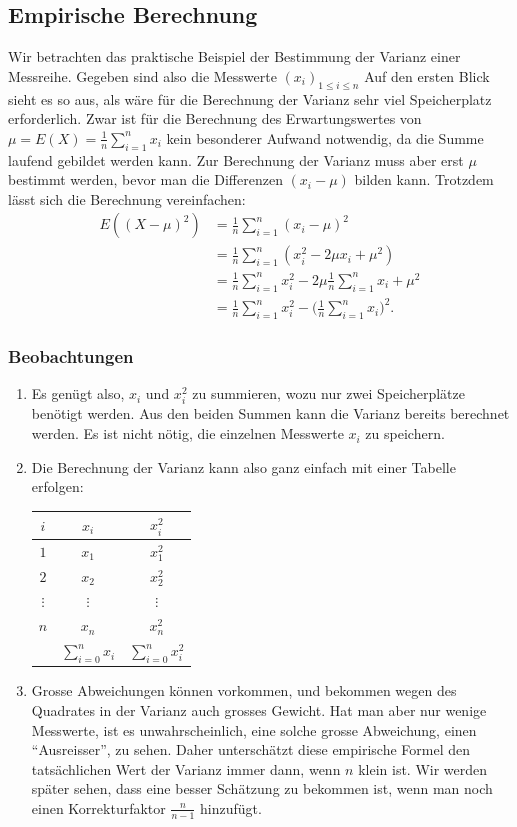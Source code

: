 \subsection{Empirische Berechnung}
Wir betrachten das praktische Beispiel der Bestimmung der Varianz
einer Messreihe.
Gegeben sind also die Messwerte $(x_i)_{1\le i\le n}$
Auf den ersten Blick sieht es so aus, als wäre für die Berechnung der Varianz
sehr viel Speicherplatz erforderlich.
Zwar ist für die Berechnung des
Erwartungswertes von $\mu=E(X)=\frac1n\sum_{i=1}^n x_i$ kein besonderer Aufwand
notwendig, da die Summe laufend gebildet werden kann.
Zur Berechnung der
Varianz muss aber erst $\mu$ bestimmt werden, bevor man die Differenzen $(x_i-\mu)$
bilden kann.
Trotzdem lässt sich die Berechnung vereinfachen:
\begin{align*}
E((X-\mu)^2)&=\frac1n\sum_{i=1}^n(x_i-\mu)^2\\
&=\frac1n\sum_{i=1}^n(x_i^2-2\mu x_i+\mu^2)\\
&=\frac1n\sum_{i=1}^nx_i^2-2\mu\frac1n\sum_{i=1}^n x_i+\mu^2\\
&=\frac1n\sum_{i=1}^nx_i^2-\biggl(\frac1n\sum_{i=1}^nx_i\biggr)^2.
\end{align*}
\subsubsection{Beobachtungen}
\begin{enumerate}
\item
Es genügt also, $x_i$ und $x_i^2$ zu summieren, wozu nur zwei Speicherplätze
benötigt werden.
Aus den beiden Summen kann die Varianz bereits berechnet werden.
Es ist nicht nötig, die einzelnen Messwerte $x_i$ zu speichern.
\item
Die Berechnung der Varianz kann also ganz einfach mit einer Tabelle
erfolgen:
\begin{center}
\begin{tabular}{|c|c|c|}
\hline
$i$&$x_i$&$x_i^2$\\
\hline
$1$&$x_1$&$x_1^2$\\
$2$&$x_2$&$x_2^2$\\
$\vdots$&$\vdots$&$\vdots$\\
$n$&$x_n$&$x_n^2$\\
\hline
&$\sum_{i=0}^n x_i$&$\sum_{i=0}^n x_i^2$\\
\hline
\end{tabular}
\end{center}
\item
Grosse Abweichungen können vorkommen, und bekommen wegen des
Quadrates in der Varianz auch grosses Gewicht.
Hat man aber nur
wenige Messwerte, ist es unwahrscheinlich, eine solche grosse
Abweichung, einen ``Ausreisser'', zu sehen.
Daher unterschätzt
diese empirische Formel den tatsächlichen Wert der Varianz immer
dann, wenn $n$ klein ist.
Wir werden später sehen, dass eine
besser Schätzung zu bekommen ist, wenn man noch einen Korrekturfaktor
$\frac{n}{n-1}$ hinzufügt.
\end{enumerate}

